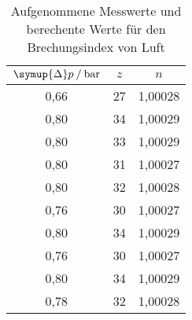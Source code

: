 \begin{table}[H]
   \centering
   \caption{Aufgenommene Messwerte und berechente Werte für den Brechungsindex von Luft}
   \label{tab:n}
   \begin{tabular} { c c c }
 \toprule
 {$\symup{\Delta}p\:/\: \mathrm{bar}$} & {$z$} & {$n$} \\
    \midrule
    0,66 & 27 & 1,00028 \\
    0,80 & 34 & 1,00029 \\
    0,80 & 33 & 1,00029 \\
    0,80 & 31 & 1,00027 \\
    0,80 & 32 & 1,00028 \\
    0,76 & 30 & 1,00027 \\
    0,80 & 34 & 1,00029 \\
    0,76 & 30 & 1,00027 \\
    0,80 & 34 & 1,00029 \\
    0,78 & 32 & 1,00028 \\
    \bottomrule
  \end{tabular}
\end{table}
